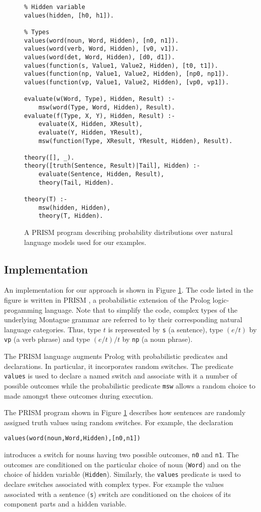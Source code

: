 \documentclass{svmult}
\begin{document}
\begin{figure}
\centering
\begin{lstlisting}
% Hidden variable
values(hidden, [h0, h1]).

% Types
values(word(noun, Word, Hidden), [n0, n1]).
values(word(verb, Word, Hidden), [v0, v1]).
values(word(det, Word, Hidden), [d0, d1]).
values(function(s, Value1, Value2, Hidden), [t0, t1]).
values(function(np, Value1, Value2, Hidden), [np0, np1]).
values(function(vp, Value1, Value2, Hidden), [vp0, vp1]).

evaluate(w(Word, Type), Hidden, Result) :-
	msw(word(Type, Word, Hidden), Result).
evaluate(f(Type, X, Y), Hidden, Result) :-
	evaluate(X, Hidden, XResult),
	evaluate(Y, Hidden, YResult),
	msw(function(Type, XResult, YResult, Hidden), Result).

theory([], _).
theory([truth(Sentence, Result)|Tail], Hidden) :-
	evaluate(Sentence, Hidden, Result),
	theory(Tail, Hidden).

theory(T) :-
	msw(hidden, Hidden),
	theory(T, Hidden).
\end{lstlisting}
\caption{A PRISM program describing probability distributions over
  natural language models used for our examples.}
\label{figure:program}
\end{figure}


\subsection{Implementation}


An implementation for our approach is shown in Figure 
\ref{figure:program}. The code listed in the figure is written in PRISM \cite{Sato:97}, a probabilistic extension of the Prolog logic-progamming language. Note that to simplify the code, complex types of the underlying Montague grammar are referred to by their corresponding natural language
categories. Thus, type $t$ is represented by \texttt{s} (a sentence), type $(e/t)$ by \texttt{vp} (a verb phrase) and type $(e/t)/t$ by \texttt{np} (a noun phrase). 

The PRISM language augments Prolog with probabilistic predicates and declarations. In particular, it incorporates random switches. The predicate \texttt{values} is used to declare a named switch and associate with it a number of possible outcomes while the probabilistic predicate \texttt{msw} allows a random choice to made amongst these outcomes during execution. 

The PRISM program shown in Figure \ref{figure:program} describes how sentences are randomly assigned truth values using random switches. For example, the declaration 
\begin{center}
\texttt{values(word(noun,Word,Hidden),[n0,n1])} 
\end{center}
introduces a switch for nouns having two possible outcomes, \texttt{n0} and \texttt{n1}.
The outcomes are conditioned on the particular choice of noun (\texttt{Word}) and on the choice of hidden variable (\texttt{Hidden}). Similarly, the \texttt{values} predicate is used to declare switches associated with complex types. For example the values associated with a sentence (\texttt{s}) switch are conditioned on the choices of its component parts and a hidden variable.
\end{document}
